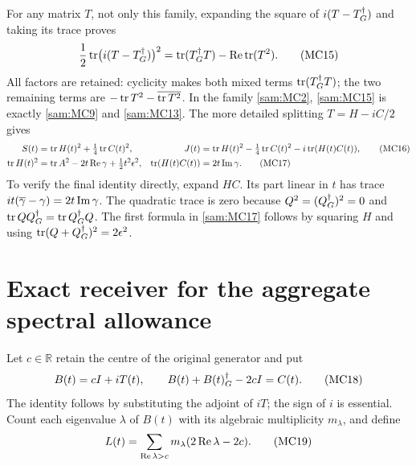 For any matrix \(T\), not only this family, expanding
the square of \(i(T-T^\dagger_G)\) and taking its trace proves
\begin{equation}
 \frac12\operatorname{tr}\bigl(i(T-T^\dagger_G)\bigr)^2
   =\operatorname{tr}(T^\dagger_G T)-\operatorname{Re}\operatorname{tr}(T^2).
 \tag{MC15}\label{sam:MC15}
\end{equation}
All factors are retained: cyclicity makes both mixed terms
\(\operatorname{tr}(T^\dagger_G T)\); the two remaining terms are
\(-\operatorname{tr} T^2-\overline{\operatorname{tr} T^2}\).
In the family \eqref{sam:MC2}, \eqref{sam:MC15} is exactly
\eqref{sam:MC9} and \eqref{sam:MC13}. The more detailed splitting
\(T=H-iC/2\) gives
\begin{align}
 S(t)&=\operatorname{tr} H(t)^2+\tfrac14\operatorname{tr} C(t)^2,
 & J(t)&=\operatorname{tr} H(t)^2-\tfrac14\operatorname{tr} C(t)^2-i\operatorname{tr}(H(t)C(t)),
 \tag{MC16}\label{sam:MC16}\\
 \operatorname{tr} H(t)^2&=\operatorname{tr} A^2-2t\operatorname{Re}\gamma+\tfrac12t^2\epsilon^2,
 & \operatorname{tr}(H(t)C(t))&=2t\operatorname{Im}\gamma.
 \tag{MC17}\label{sam:MC17}
\end{align}
To verify the final identity directly, expand \(HC\). Its part linear
in \(t\) has trace \(it(\overline\gamma-\gamma)=2t\operatorname{Im}\gamma\).
The quadratic trace is zero because \(Q^2=(Q^\dagger_G)^2=0\) and
\(\operatorname{tr} QQ^\dagger_G=\operatorname{tr} Q^\dagger_G Q\). The first formula in \eqref{sam:MC17}
follows by squaring \(H\) and using
\(\operatorname{tr}(Q+Q^\dagger_G)^2=2\epsilon^2\).

\section{Exact receiver for the aggregate spectral allowance}

Let \(c\in\mathbb R\) retain the centre of the original generator and put
\begin{equation}
 B(t)=cI+iT(t),\qquad
 B(t)+B(t)^\dagger_G-2cI=C(t).
 \tag{MC18}\label{sam:MC18}
\end{equation}
The identity follows by substituting the adjoint of \(iT\);
the sign of \(i\) is essential. Count each eigenvalue \(\lambda\)
of \(B(t)\) with its algebraic multiplicity \(m_\lambda\), and define
\begin{equation}
 L(t)=\sum_{\operatorname{Re}\lambda>c}m_\lambda(2\operatorname{Re}\lambda-2c).
 \tag{MC19}\label{sam:MC19}
\end{equation}

